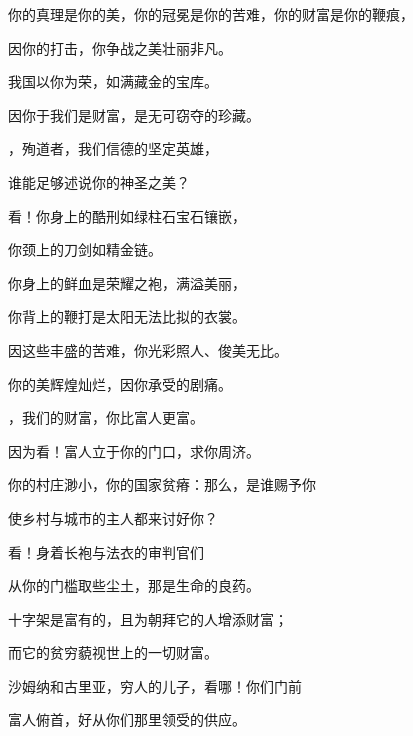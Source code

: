 你的真理是你的美，你的冠冕是你的苦难，你的财富是你的鞭痕，\par

因你的打击，你争战之美壮丽非凡。\par

我国以你为荣，如满藏金的宝库。\par

因你于我们是财富，是无可窃夺的珍藏。\par

，殉道者，我们信德的坚定英雄，\par

谁能足够述说你的神圣之美？\par

看！你身上的酷刑如绿柱石宝石镶嵌，\par

你颈上的刀剑如精金链。\par

你身上的鲜血是荣耀之袍，满溢美丽，\par

你背上的鞭打是太阳无法比拟的衣裳。\par

因这些丰盛的苦难，你光彩照人、俊美无比。\par

你的美辉煌灿烂，因你承受的剧痛。\par

，我们的财富，你比富人更富。\par

因为看！富人立于你的门口，求你周济。\par

你的村庄渺小，你的国家贫瘠：那么，是谁赐予你\par

使乡村与城市的主人都来讨好你？\par

看！身着长袍与法衣的审判官们\par

从你的门槛取些尘土，那是生命的良药。\par

十字架是富有的，且为朝拜它的人增添财富；\par

而它的贫穷藐视世上的一切财富。\par

沙姆纳和古里亚，穷人的儿子，看哪！你们门前\par

富人俯首，好从你们那里领受的供应。\par

